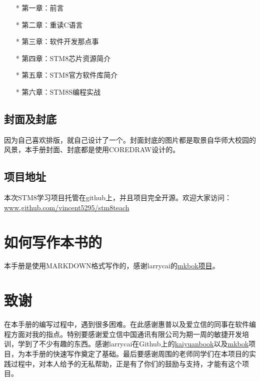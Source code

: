\documentclass[a4paper]{book}
\newcounter{tab}[chapter]
\begin{document}
\begin{itemize}\setlength{\itemsep}{1pt}\setlength{\parskip}{0pt}\setlength{\parsep}{0pt}
\item[*]
  第一章：前言
\item[*]
  第二章：重读C语言
\item[*]
  第三章：软件开发那点事
\item[*]
  第四章：STM8芯片资源简介
\item[*]
  第五章：STM8官方软件库简介
\item[*]
  第六章：STM8S编程实战
\end{itemize}
\subsection*{封面及封底}

因为自己喜欢排版，就自己设计了一个。封面封底的图片都是取景自华师大校园的风景，本手册封面、封底都是使用COREDRAW设计的。

\subsection*{项目地址}

本次STM8学习项目托管在github上，并且项目完全开源。欢迎大家访问：\href{www.github.com/vincent5295/stm8teach}{www.github.com/vincent5295/stm8teach}

\section*{如何写作本书的}

本手册是使用MARKDOWN格式写作的，感谢larrycai的\href{www.github.com/larrycai/mkbok}{mkbok项目}。

\section*{致谢}

在本手册的编写过程中，遇到很多困难。在此感谢惠普以及爱立信的同事在软件编程方面对我的指点。特别要感谢爱立信中国通讯有限公司为期一周的敏捷开发培训，学到了不少有趣的东西。感谢larrycai在Github上的\href{www.github.com/larrycai/kaiyuanbook}{kaiyuanbook}以及\href{www.github.com/larrycai/mkbok}{mkbok}项目，为本手册的快速写作奠定了基础。最后要感谢周围的老师同学们在本项目的实践过程中，对本人给予的无私帮助，正是有了你们的鼓励与支持，才能有这个项目。

\tableofcontents\newpage\thispagestyle{empty}

\end{document}
